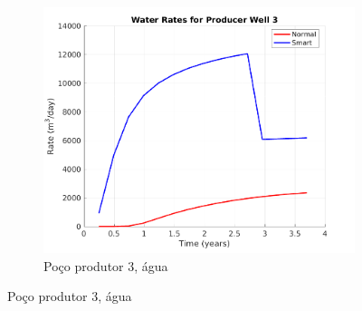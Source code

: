 \begin{figure}[!ht]
	~
	\begin{subfigure}[b]{.3\textwidth}
		\includegraphics[width=\textwidth]{figs/resultadosSSAIGUP/SSAIGUP_WaterWell3_Zoom}
		\caption{Po\c{c}o produtor 3, \'{a}gua}
		\label{SSAIGUP_WaterWell3}
	\end{subfigure}
	

\end{figure}
